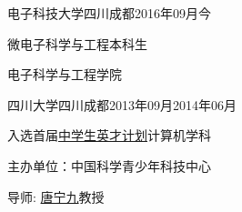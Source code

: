 
\begin{eduitem}{电子科技大学}{四川成都}{2016年09月}{今}
\item 微电子科学与工程本科生
\item 电子科学与工程学院
\end{eduitem}

\begin{eduitem}{四川大学}{四川成都}{2013年09月}{2014年06月}
\item 入选首届\href{http://ycjh.org}{中学生英才计划}计算机学科
\item 主办单位：中国科学青少年科技中心
\item 导师: \href{http://cs.scu.edu.cn/info/1074/3930.htm}{唐宁九}教授
\end{eduitem}


\endinput